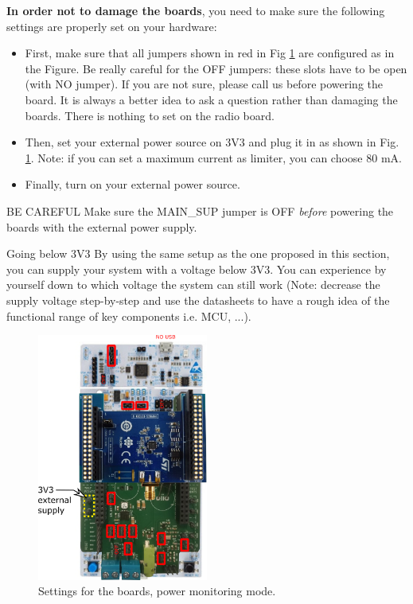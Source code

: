 \textbf{In order not to damage the boards}, you need to make sure the following settings are properly set on your hardware:

\begin{itemize}
    \item First, make sure that all jumpers shown in red in Fig \ref{fig:settings-mode-3V3} are configured as in the Figure.
    Be really careful for the OFF jumpers: these slots have to be open (with NO jumper). If you are not sure, please call us before powering the board. It is always a better idea to ask a question rather than damaging the boards. There is nothing to set on the radio board.
    \item Then, set your external power source on 3V3 and plug it in as shown in Fig. \ref{fig:settings-mode-3V3}. Note: if you can set a maximum current as limiter, you can choose 80 mA.
    \item Finally, turn on your external power source.
\end{itemize}

\begin{bclogo}[couleur = gray!20, arrondi = 0.2, logo=\bcattention]{BE CAREFUL}
Make sure the MAIN\_SUP jumper is OFF \textit{before} powering the boards with the external power supply.
\end{bclogo}

\begin{bclogo}[couleur = gray!20, arrondi = 0.2, logo=\bcinfo]{Going below 3V3}
By using the same setup as the one proposed in this section, you can supply your system with a voltage below 3V3. You can experience by yourself down to which voltage the system can still work (Note: decrease the supply voltage step-by-step and use the datasheets to have a rough idea of the functional range of key components i.e. MCU, ...).
\end{bclogo}

\begin{figure}[h!]
    \centering
    \includegraphics[width=0.5\textwidth]{figs/settings-mode-3V3.png}
    \caption{Settings for the boards, power monitoring mode.}
    \label{fig:settings-mode-3V3}
\end{figure}

